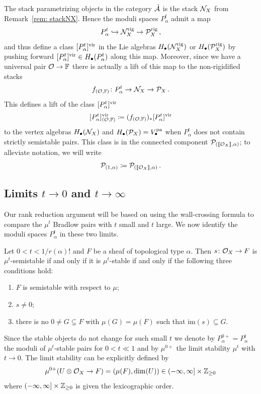 \documentclass[a4paper, 12pt]{amsart}
\begin{document}
The stack parametrizing objects in the category $\grave {{\mathcal A}}$ is the stack ${\mathcal N}_X$ from Remark~\ref{rem: stackNX}. Hence the moduli spaces $P_\alpha^t$ admit a map
\[P_\alpha^t\hookrightarrow {\mathcal N}_X^{\mathrm{rig}}\rightarrow {\mathcal P}_X^{\mathrm{rig}}\,,\]
and thus define a class $[P_\alpha^t]^{\mathrm{vir}}$ in the Lie algebras $H_\bullet({\mathcal N}_X^{\mathrm{rig}})$ or $ H_\bullet({\mathcal P}_X^{\mathrm{rig}})$ by pushing forward $[P_\alpha^t]^{\mathrm{vir}}\in H_\bullet(P_\alpha^t)$ along this map. Moreover, since we have a universal pair ${\mathcal O}\to{\mathbb{F}}$ there is actually a lift of this map to the non-rigidified stacks
\[f_{({\mathcal O},{\mathbb{F}})}\colon P_\alpha^t\to {\mathcal N}_X \rightarrow {\mathcal P}_X\,.\]
This defines a lift of the class $[P_\alpha^t]^{\mathrm{vir}}$
\[[P_\alpha^t]^{\mathrm{vir}}_{({\mathcal O},{\mathbb{F}})}\coloneqq (f_{({\mathcal O},{\mathbb{F}})})_\ast [P_\alpha^t]^{\mathrm{vir}}\]
to the vertex algebras $H_\bullet({\mathcal N}_X)$ and $ H_\bullet({\mathcal P}_X)=V_\bullet^{\mathop{\rm pa}\nolimits}$ when $P_\alpha^t$ does not contain strictly semistable pairs. This class is in the connected component ${\mathcal P}_{(\llbracket {\mathcal O}_X\rrbracket, \alpha)}$; to alleviate notation, we will write 
\[{\mathcal P}_{(1, \alpha)}\coloneqq {\mathcal P}_{(\llbracket {\mathcal O}_X\rrbracket, \alpha)}\,.\]

\subsection{Limits $t\rightarrow 0$ and $t\to \infty$}
\label{sec: limits}
Our rank reduction argument will be based on using the wall-crossing formula to compare the $\mu^t$ Bradlow pairs with $t$ small and $t$ large. We now identify the moduli spaces $P_\alpha^t$ in these two limits.

\begin{proposition}[{\cite[Theorem 8.13, Ex. 5.6]{Jo21}}]

\label{prop: limitt0}
Let $0<t<1/r(\alpha)!$ and $F$ be a sheaf of topological type $\alpha$. Then  $s\colon {\mathcal O}_X\to F$ is $\mu^{t}$-semistable if and only if it is $\mu^{t}$-stable if and only if the following three conditions hold:
\begin{enumerate}
    \item $F$ is semistable with respect to $\mu$;
    \item $s\neq 0$;
    \item there is no $0\neq G\subsetneq F$ with $\mu(G)=\mu(F)$ such that $\mathrm{im}(s)\subseteq G$.
\end{enumerate}
\end{proposition}

Since the stable objects do not change for such small $t$ we denote by $P_\alpha^{0+}=P_\alpha^t$ the moduli of $\mu^t$-stable pairs for $0<t\ll 1$ and by $\mu^{0+}$ the limit stability $\mu^t$ with $t\rightarrow 0$. The limit stability can be explicitly defined by
\[\mu^{0+}(U\otimes {\mathcal O}_X\to F)=(\mu(F), \dim(U))\in (-\infty, \infty]\times {\mathbb{Z}}_{\geq 0}\]
where $(-\infty, \infty]\times {\mathbb{Z}}_{\geq 0}$ is given the lexicographic order.
\end{document}
